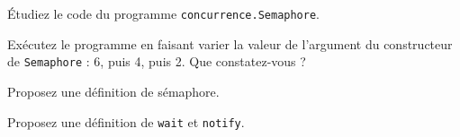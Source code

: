 
\begingroup

\begin{exercice}[Moniteurs]

  Étudiez le code du programme \texttt{concurrence.Semaphore}.

  \begin{questions} 
  \item Exécutez le programme en faisant varier la valeur de l'argument du constructeur de \lstinline{Semaphore} : 6, puis 4, puis 2. Que constatez-vous ?
  \item Proposez une définition de sémaphore.
  \item Proposez une définition de \lstinline{wait} et \lstinline{notify}.
  \end{questions}

\end{exercice}

\endgroup
\endinput
